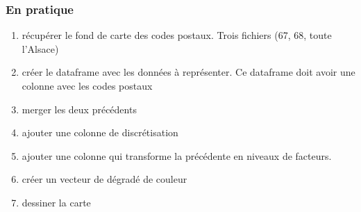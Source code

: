 \documentclass[]{article}
\begin{document}
\subsubsection{En pratique}\label{en-pratique}

\begin{enumerate}
\def\labelenumi{\arabic{enumi}.}
\itemsep1pt\parskip0pt
\item
  récupérer le fond de carte des codes postaux. Trois fichiers (67, 68,
  toute l'Alsace)
\item
  créer le dataframe avec les données à représenter. Ce dataframe doit
  avoir une colonne avec les codes postaux
\item
  merger les deux précédents
\item
  ajouter une colonne de discrétisation
\item
  ajouter une colonne qui transforme la précédente en niveaux de
  facteurs.
\item
  créer un vecteur de dégradé de couleur
\item
  dessiner la carte
\end{enumerate}
\end{document}
